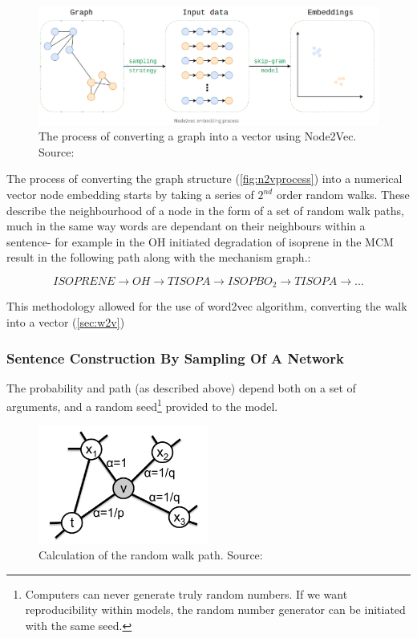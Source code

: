 \begin{figure}[H]
  \centering
\includegraphics[width=\textwidth]{4fig/n2vproc.png}
\caption{The process of converting a graph into a vector using Node2Vec. Source:\citep{n2vimg}}\label{fig:n2vprocess}
\end{figure}


The process of converting the graph structure (\autoref{fig:n2vprocess}) into a numerical vector node embedding starts by taking a series of $2^{nd}$ order random walks. These describe the neighbourhood of a node in the form of a set of random walk paths, much in the same way words are dependant on their neighbours within a sentence- for example in the OH initiated degradation of isoprene in the MCM result in the following path along with the mechanism graph.:


\begin{equation}
ISOPRENE \rightarrow OH \rightarrow TISOPA \rightarrow ISOPBO_2 \rightarrow TISOPA \rightarrow...
\label{eqn:w2varrow}
\end{equation}

This methodology allowed for the use of word2vec algorithm, converting the walk into a vector (\autoref{sec:w2v})



\subsubsection{Sentence Construction By Sampling Of A Network}
The probability and path (as described above) depend both on a set of arguments, and a random seed\footnote{Computers can never generate truly random numbers. If we want reproducibility within models, the random number generator can be initiated with the same seed.} provided to the model.

\begin{figure}[H]
  \centering
\includegraphics[width=0.5\textwidth]{4fig/n2vedge.png}
\caption{Calculation of the random walk path. Source:\citep{node2vec}}\label{fig:n2vedge}
\end{figure}


